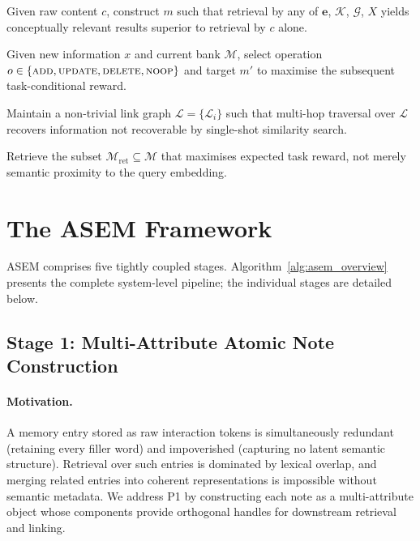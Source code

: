 \documentclass{article}
\newcommand{\memset}{\mathcal{M}}
\newcommand{\note}{m}
\newcommand{\ours}{\textsc{ASEM}\xspace}
\begin{document}
\begin{description}[leftmargin=1.5em, style=nextline]
  \item[\textbf{P1 --- Semantic enrichment.}]
  Given raw content $c$, construct $\note$ such that retrieval by any of
  $\mathbf{e}$, $\mathcal{K}$, $\mathcal{G}$, $X$ yields conceptually
  relevant results superior to retrieval by $c$ alone.
  \item[\textbf{P2 --- Principled write selection.}]
  Given new information $x$ and current bank $\memset$, select operation
  $o \in \{\textsc{add}, \textsc{update}, \textsc{delete}, \textsc{noop}\}$
  and target $\note'$ to maximise the subsequent task-conditional reward.
  \item[\textbf{P3 --- Relational structure.}]
  Maintain a non-trivial link graph $\mathcal{L} = \{\mathcal{L}_i\}$ such
  that multi-hop traversal over $\mathcal{L}$ recovers information not
  recoverable by single-shot similarity search.
  \item[\textbf{P4 --- Utility-aware retrieval.}]
  Retrieve the subset $\memset_{\mathrm{ret}} \subseteq \memset$ that
  maximises expected task reward, not merely semantic proximity to the query
  embedding.
\end{description}


\section{The \ours Framework}
\label{sec:methodology}

\ours comprises five tightly coupled stages.
Algorithm~\ref{alg:asem_overview} presents the complete system-level pipeline;
the individual stages are detailed below.

\subsection{Stage 1: Multi-Attribute Atomic Note Construction}
\label{sec:stage1}

\paragraph{Motivation.}
A memory entry stored as raw interaction tokens is simultaneously redundant
(retaining every filler word) and impoverished (capturing no latent semantic
structure).
Retrieval over such entries is dominated by lexical overlap, and merging
related entries into coherent representations is impossible without semantic
metadata.
We address P1 by constructing each note as a multi-attribute object whose
components provide orthogonal handles for downstream retrieval and linking.
\end{document}
